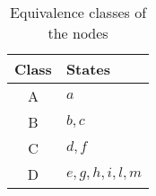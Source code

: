 \begin{example}
    \begin{table}[H]
        \centering
        \begin{tabular}{|c|l|}
            \hline
            \textbf{Class} & \textbf{States} \\
            \hline
            A & $a$ \\
            B & $b, c$ \\
            C & $d, f$ \\
            D & $e, g, h, i, l, m$ \\
            \hline
        \end{tabular}
        \caption{Equivalence classes of the nodes}
        \label{tab:equivalence_classes}
    \end{table}
\end{example}